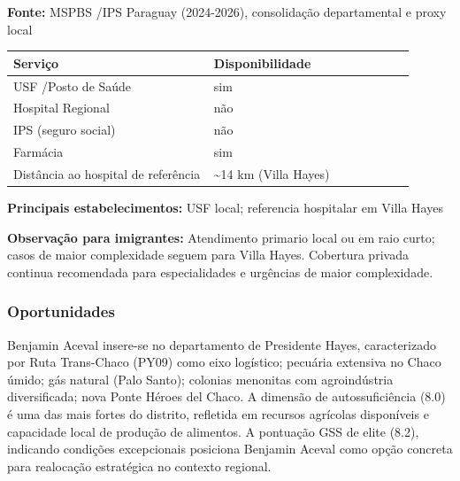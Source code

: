 \textbf{Fonte:} MSPBS /\allowbreak  IPS Paraguay (2024-2026), consolidação
departamental e proxy local

{\def\LTcaptype{none} %
\begin{longtable}{@{}>{\raggedright\arraybackslash}p{0.45\linewidth} >{\raggedright\arraybackslash}p{0.45\linewidth}@{}}
\toprule\noalign{}
Serviço & Disponibilidade \\
\midrule\noalign{}
\endhead
\bottomrule\noalign{}
\endlastfoot
USF /\allowbreak  Posto de Saúde & sim \\
Hospital Regional & não \\
IPS (seguro social) & não \\
Farmácia & sim \\
Distância ao hospital de referência & \textasciitilde14 km (Villa
Hayes) \\
\end{longtable}
}

\textbf{Principais estabelecimentos:} USF local; referencia hospitalar
em Villa Hayes

\textbf{Observação para imigrantes:} Atendimento primario local ou em
raio curto; casos de maior complexidade seguem para Villa Hayes.
Cobertura privada continua recomendada para especialidades e urgências
de maior complexidade.
\newpage

\subsubsection*{Oportunidades}\label{oport-benjamin-aceval-1502}
Benjamin Aceval insere-se no departamento de Presidente Hayes, caracterizado por Ruta Trans-Chaco (PY09) como eixo logístico; pecuária extensiva no Chaco úmido; gás natural (Palo Santo); colonias menonitas com agroindústria diversificada; nova Ponte Héroes del Chaco. A dimensão de autossuficiência (8.0) é uma das mais fortes do distrito, refletida em recursos agrícolas disponíveis e capacidade local de produção de alimentos. A pontuação GSS de elite (8.2), indicando condições excepcionais posiciona Benjamin Aceval como opção concreta para realocação estratégica no contexto regional.


